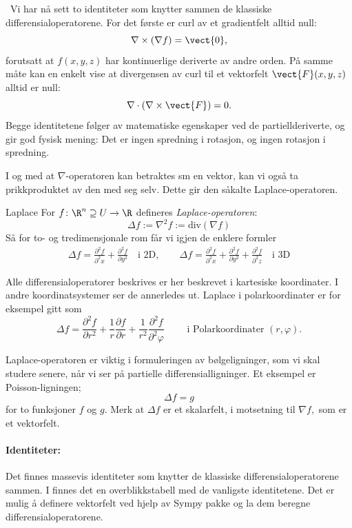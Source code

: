 \begin{oppsum}\,
Vi har nå sett to identiteter som knytter sammen de klassiske differensialoperatorene. For det første er curl av et gradientfelt alltid null:
\[\nabla\times(\nabla f)=\vect{0},\]
forutsatt at $f(x,y,z)$ har kontinuerlige deriverte av andre orden. På samme måte kan en enkelt vise at divergensen av curl til et vektorfelt $\vect{F}(x,y,z)$ alltid er null:
\[\nabla\cdot\left(\nabla\times\vect{F}\right)=0.\]
Begge identitetene følger av matematiske egenskaper ved de partiellderiverte, og gir god fysisk mening: Det er ingen spredning i rotasjon, og ingen rotasjon i spredning.
\end{oppsum}
I og med at $\nabla$-operatoren kan betraktes sm en vektor, kan vi også ta prikkproduktet av den med seg selv. Dette gir den såkalte Laplace-operatoren.

\begin{defn}{Laplace}
For $f\colon \R^n\supseteq U \rightarrow \R$ defineres \emph{Laplace-operatoren}:
\[
\Delta f := \nabla^2 f := \text{div}(\nabla f)
\]
Så for to- og tredimensjonale rom får vi igjen de enklere formler
\begin{align*}
 \Delta f = \frac{\partial^2 f}{\partial^2 x} + \frac{\partial^2f}{\partial y^2} \quad \text{i 2D}, \qquad
 \Delta f = \frac{\partial^2 f}{\partial^2 x} + \frac{\partial^2f}{\partial y^2} +  \frac{\partial^2 f}{\partial^2 z} \quad \text{i 3D}
\end{align*}
\end{defn}
\begin{rem}{}
Alle differensialoperatorer beskrives er her beskrevet i kartesiske koordinater. I andre koordinatsystemer ser de annerledes ut. Laplace i polarkoordinater er for eksempel gitt som 
\[\Delta f = \frac{\partial^2 f}{\partial r^2} + \frac{1}{r}\frac{\partial f}{\partial r} + \frac{1}{r^2} \frac{\partial^2 f}{\partial^2 \varphi}\qquad \text{ i Polarkoordinater } (r,\varphi).\]
\end{rem}
Laplace-operatoren er viktig i formuleringen av bølgeligninger, som vi skal studere senere, når vi ser på partielle differensialligninger. Et eksempel er Poisson-ligningen; 
\[\Delta f=g\]
for to funksjoner $f$ og $g$. Merk at $\Delta f$ er et skalarfelt, i motsetning til $\nabla f, $ som er et vektorfelt.

\paragraph{Identiteter: }Det finnes massevis identiteter som knytter de klassiske differensialoperatorene sammen. I  finnes det en overblikkstabell med de vanligste identitetene.
Det er mulig å definere vektorfelt ved hjelp av Sympy pakke og la dem beregne differensialoperatorene.

